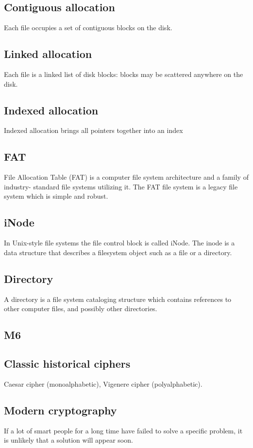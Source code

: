 \subsection{Contiguous allocation}
Each file occupies a set of contiguous blocks on the disk.

\subsection{Linked allocation}
Each file is a linked list of disk blocks: blocks may be
scattered anywhere on the disk.

\subsection{Indexed allocation}
Indexed allocation brings all pointers together into an index

\subsection{FAT}
File Allocation Table (FAT) is a computer file
system architecture and a family of industry-
standard file systems utilizing it. The FAT file
system is a legacy file system which is simple and robust.

\subsection{iNode}
In Unix-style file systems the file control
block is called iNode.
The inode is a data structure that
describes a filesystem object such as
a file or a directory.

\subsection{Directory}
 A directory is a file system cataloging
structure which contains references to
other computer files, and possibly other
directories.

\subsection{M6}
\subsection{Classic historical ciphers}
Caesar cipher (monoalphabetic),
Vigenere cipher (polyalphabetic).

\subsection{Modern cryptography}
If a lot of smart people for a long time have failed to solve a specific problem,
it is unlikely that a solution will appear soon. \newline

